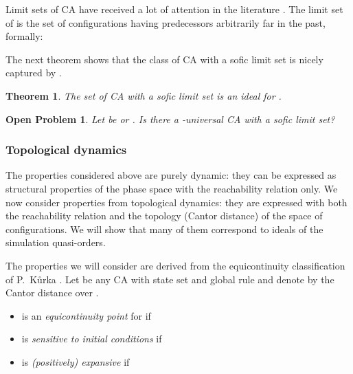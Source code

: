 \documentclass[a4paper]{elsarticle}
\def\qed{\relax\ifmmode\hskip2em \blacksquare\else\unskip\nobreak\hfill\hskip1em \fi}
\newtheorem{thm}{Theorem}[section]
\newtheorem{openpb}{Open Problem}
\begin{document}
Limit sets of CA have received a lot of attention in the literature
\cite{Culik89, hur87, goles93}. The limit set of  is the set
 of configurations having predecessors arbitrarily far in
the past, formally:


The next theorem shows that the class of CA with a sofic limit set is
nicely captured by .

\begin{thm}
  \label{thm:soficideal}
  The set of CA with a sofic limit set is an ideal for .
\end{thm}

\begin{openpb}
  Let  be  or . Is there a -universal CA
  with a sofic limit set?
\end{openpb}

\subsubsection{Topological dynamics}

The properties considered above are purely dynamic: they can be
expressed as structural properties of the phase space with the
reachability relation only. We now consider properties from
topological dynamics: they are expressed with both the reachability
relation and the topology (Cantor distance) of the space of
configurations.  We will show that many of them correspond to ideals
of the simulation quasi-orders.

The properties we will consider are derived from the equicontinuity
classification of P.~K{\r u}rka \cite{Kurka97}. Let  be any CA
with state set  and global rule  and denote by  the
Cantor distance over .
\begin{itemize}
\item  is an \emph{equicontinuity point} for  if 
  
\item  is \emph{sensitive to initial conditions} if
  
\item  is \emph{(positively) expansive} if
  
\end{itemize}
\end{document}
